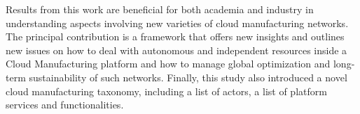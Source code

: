 Results from this work are beneficial for both academia and industry in understanding aspects involving new varieties of cloud manufacturing networks. The principal contribution is a framework that offers new insights and outlines new issues on how to deal with autonomous and independent resources inside a Cloud Manufacturing platform and how to manage global optimization and long-term sustainability of such networks. Finally, this study also introduced a novel cloud manufacturing taxonomy, including a list of actors, a list of platform services and functionalities.
